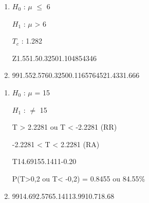 \begin{question}
    
    \begin{enumerate}[label={\textbf{\alph*)}}]
        
        \item 
    
            $H_0$ : $\mu$ $\leq$ 6 

            $H_1$ : $\mu$ > 6 
        
            $T_c$ : 1.282

            \begin{formula7}
                {Z}{1.55}{1.5}{0.32}{50}{1.104854346}
            \end{formula7}

        \item 
    
            \begin{formula1}
                {99}{1.55}{2.576}{0.32}{50}{0.116576452}{1.433}{1.666}
            \end{formula1}

    \end{enumerate}
\end{question}


\begin{question}
    
    \begin{enumerate}[label={\textbf{\alph*)}}]
        
        \item 
        
            $H_0$ : $\mu$ = 15 

            $H_1$ : $\neq$ 15 
        
            T > 2.2281 ou T < -2.2281 (RR)

            -2.2281 < T < 2.2281 (RA)

            \begin{formula7}
                {T}{14.69}{15}{5.14}{11}{-0.20}
            \end{formula7}

            P(T>0,2 ou T< -0,2) = 0.8455 ou 84.55\%
        \item 
    
            \begin{formula2}
                {99}{14.69}{2.576}{5.14}{11}{3.99}{10.7}{18.68}
            \end{formula2}

    \end{enumerate}
\end{question}

